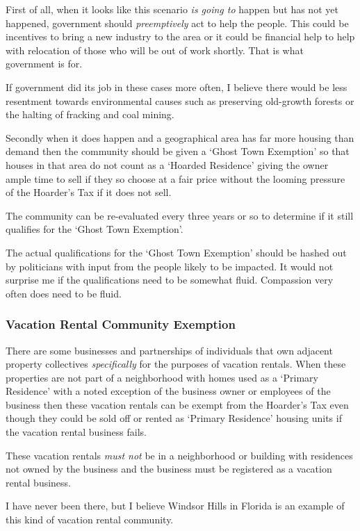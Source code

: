 First of all, when it looks like this scenario \emph{is going to} happen but has not yet happened, government should \emph{preemptively} act to help the people. This could be incentives to bring a new industry to the area or it could be financial help to help with relocation of those who will be out of work shortly. That is what government is for.

If government did its job in these cases more often, I believe there would be less resentment towards environmental causes such as preserving old-growth forests or the halting of fracking and coal mining.

Secondly when it does happen and a geographical area has far more housing than demand then the community should be given a `Ghost Town Exemption' so that houses in that area do not count as a `Hoarded Residence' giving the owner ample time to sell if they so choose at a fair price without the looming pressure of the Hoarder's Tax if it does not sell.

The community can be re-evaluated every three years or so to determine if it still qualifies for the `Ghost Town Exemption'.

The actual qualifications for the `Ghost Town Exemption' should be hashed out by politicians with input from the people likely to be impacted. It would not surprise me if the qualifications need to be somewhat fluid. Compassion very often does need to be fluid.

\subsubsection{Vacation Rental Community Exemption}

There are some businesses and partnerships of individuals that own adjacent property collectives \emph{specifically} for the purposes of vacation rentals. When these properties are not part of a neighborhood with homes used as a `Primary Residence' with a noted exception of the business owner or employees of the business then these vacation rentals can be exempt from the Hoarder's Tax even though they could be sold off or rented as `Primary Residence' housing units if the vacation rental business fails.

These vacation rentals \emph{must not} be in a neighborhood or building with residences not owned by the business and the business must be registered as a vacation rental business.

I have never been there, but I believe Windsor Hills in Florida is an example of this kind of vacation rental community.

